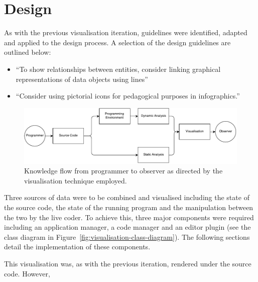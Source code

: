 \more

\section{Design}

As with the previous visualisation iteration, guidelines were identified, adapted and applied to the design process. A selection of the design guidelines are outlined below:

\begin{itemize}
\item ``To show relationships between entities, consider linking graphical representations of data objects using lines''~\cite[p.~183]{Ware2013a} 
\item ``Consider using pictorial icons for pedagogical purposes in infographics.''~\cite[p.~320]{Ware2013a} 
\end{itemize}







\begin{figure}
  \centering \includegraphics[width=\columnwidth]{../images/diagrams/knowledge-flow-refined.pdf}
  \caption{Knowledge flow from programmer to observer as directed by the visualisation technique employed.}
\label{fig:knowledge-flow-refined}
\end{figure}

Three sources of data were to be combined and visualised including the state of the source code, the state of the running program and the manipulation between the two by the live coder. To achieve this, three major components were required including an application manager, a code manager and an editor plugin (see the class diagram in Figure~\ref{fig:visualisation-class-diagram}). The following sections detail the implementation of these components.

This visualisation was, as with the previous iteration, rendered under the source code. However, \more




